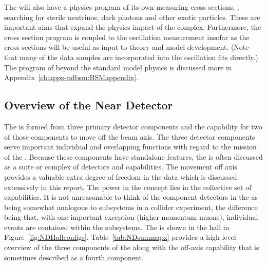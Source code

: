The   will also have a physics program of its own measuring cross sections, , searching for sterile neutrinos, dark photons and other exotic particles. These are important aims that expand the physics impact of the  complex.  %
Furthermore, the cross section program is coupled to the oscillation measurement insofar as the cross sections will be useful as input to theory and model development.   (Note that many of the  data samples are incorporated into the oscillation fits directly.) The   program of beyond the standard model physics is discussed more in Appendix~\ref{ch:appx-ndbsm:BSMappendix}.


\subsection{Overview of the Near Detector}
\label{sec:appx-nd:BriefOverview}

The   is formed from three primary detector components and the capability for two of those components to move off the beam axis. The three detector components serve important individual and overlapping functions with regard to the mission of the .  Because these components have standalone features, the   is often discussed as a suite or complex of detectors and capabilities.  The movement off axis provides a valuable extra degree of freedom in the data which is discussed extensively in this report.  The power in the   concept lies in the collective set of capabilities.  It is not unreasonable to think of the component detectors in the   as being somewhat analogous to subsystems in a collider experiment, the difference being that, with one important exception (higher momentum muons), individual events are contained within the subsystems.  
The   is shown in the   hall in Figure~\ref{fig:NDHallconfigs}.  Table~\ref{tab:NDsummapx} provides a high-level overview of the three components of the   along with the off-axis capability that is sometimes described as a fourth component.  

